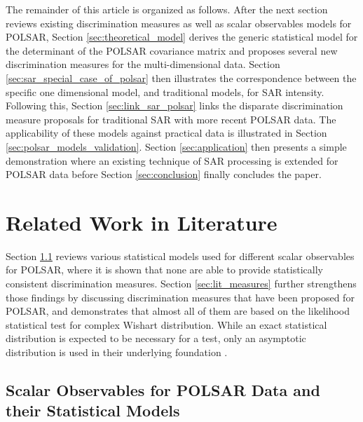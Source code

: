 \documentclass[journal]{IEEEtran}
\begin{document}
The remainder of this article is organized as follows.
After the next section reviews existing discrimination measures as well as scalar observables models for POLSAR, Section \ref{sec:theoretical_model}
  derives the generic statistical model for the determinant of the POLSAR covariance matrix
  and proposes several new discrimination measures for the multi-dimensional data.
Section \ref{sec:sar_special_case_of_polsar} then illustrates the correspondence between the specific one dimensional model, and traditional models, for SAR intensity. 
Following this, Section \ref{sec:link_sar_polsar} links the disparate discrimination measure proposals for traditional SAR with more recent POLSAR data.
The applicability of these models against practical data is illustrated in Section \ref{sec:polsar_models_validation}.
Section \ref{sec:application} then presents a simple demonstration where an existing technique of SAR processing is extended for POLSAR data before
  Section \ref{sec:conclusion} finally concludes the paper.

\section{Related Work in Literature}
\label{sec:lit_review}

Section \ref{sec:lit_models} reviews various statistical models used for different scalar observables for POLSAR,
  where it is shown that none are able to provide statistically consistent discrimination measures. 
Section \ref{sec:lit_measures} further strengthens those findings by discussing discrimination measures that have been proposed for POLSAR,
  and demonstrates that almost all of them are based on the likelihood statistical test for complex Wishart distribution.
While an exact statistical distribution is expected to be necessary for a test,
  only an asymptotic distribution is used in their underlying foundation \cite{Conradsen_2003_TGRS_4}.
  
\subsection{Scalar Observables for POLSAR Data and their Statistical Models}
\label{sec:lit_models}
\end{document}
